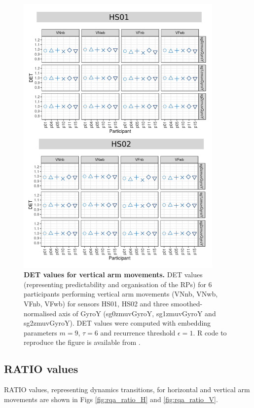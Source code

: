 \begin{figure}[!h]
\centering
\includegraphics[width=0.9\textwidth]{rqa_det_V_w500}
    \caption{
	{\bf DET values for vertical arm movements.}	
    	DET values (representing predictability and organisation of the RPs)
	for 6 participants performing vertical arm movements 
	(VNnb, VNwb, VFnb, VFwb)
	for sensors HS01, HS02 and three smoothed-normalised axis 
	of GyroY (sg0zmuvGyroY, sg1zmuvGyroY and sg2zmuvGyroY).
	DET values were computed with 
	embedding parameters $m=9$, $\tau=6$ and recurrence threshold
	$\epsilon=1$.
	R code to reproduce the figure is available from \cite{hwum2018}.
        }
    \label{fig:rqa_det_V}
\end{figure}



\subsection{RATIO values}
RATIO values, representing dynamics transitions, for horizontal and 
vertical arm movements are shown in Figs \ref{fig:rqa_ratio_H} and 
\ref{fig:rqa_ratio_V}.

